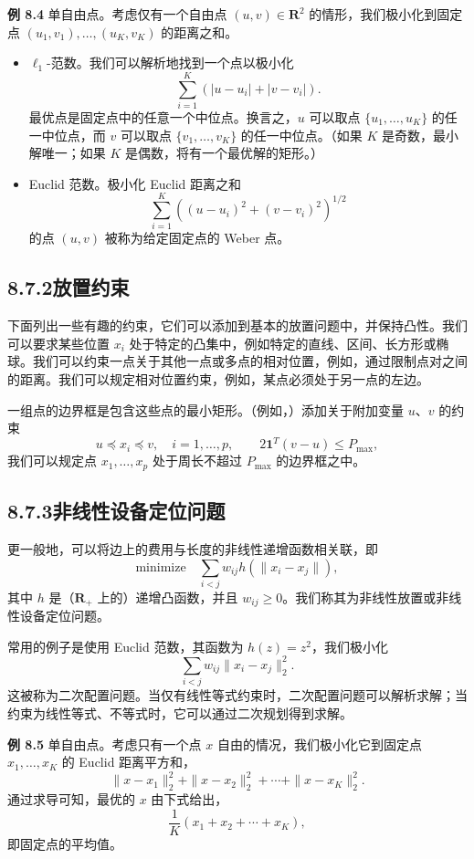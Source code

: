 \documentclass[UTF8, 12pt, fontset=fandol, oneside]{ctexart}
\begin{document}
\noindent\textbf{例 8.4}\quad
单自由点。考虑仅有一个自由点 $(u,v)\in\mathbf{R}^2$ 的情形，我们极小化到固定点 $(u_1,v_1),\ldots,(u_K,v_K)$ 的距离之和。

\begin{itemize}
\item $\ell_1$-范数。我们可以解析地找到一个点以极小化
\[
\sum_{i=1}^K(|u-u_i|+|v-v_i|).
\]
最优点是固定点中的任意一个中位点。换言之，$u$ 可以取点 $\{u_1,\ldots,u_K\}$ 的任一中位点，而 $v$ 可以取点 $\{v_1,\ldots,v_K\}$ 的任一中位点。（如果 $K$ 是奇数，最小解唯一；如果 $K$ 是偶数，将有一个最优解的矩形。）

\item Euclid 范数。极小化 Euclid 距离之和
\[
\sum_{i=1}^K\left((u-u_i)^2+(v-v_i)^2\right)^{1/2}
\]
的点 $(u,v)$ 被称为给定固定点的 Weber 点。
\end{itemize}

\subsection*{8.7.2\quad 放置约束}

下面列出一些有趣的约束，它们可以添加到基本的放置问题中，并保持凸性。我们可以要求某些位置 $x_i$ 处于特定的凸集中，例如特定的直线、区间、长方形或椭球。我们可以约束一点关于其他一点或多点的相对位置，例如，通过限制点对之间的距离。我们可以规定相对位置约束，例如，某点必须处于另一点的左边。

一组点的边界框是包含这些点的最小矩形。（例如，）添加关于附加变量 $u$、$v$ 的约束
\[
u\preceq x_i\preceq v,\quad i=1,\ldots,p,\qquad
2\mathbf{1}^T(v-u)\leq P_{\max},
\]
我们可以规定点 $x_1,\ldots,x_p$ 处于周长不超过 $P_{\max}$ 的边界框之中。

\subsection*{8.7.3\quad 非线性设备定位问题}

更一般地，可以将边上的费用与长度的非线性递增函数相关联，即
\[
\mbox{minimize}\quad \sum_{i<j} w_{ij}h(\|x_i-x_j\|),
\]
其中 $h$ 是（$\mathbf{R}_+$ 上的）递增凸函数，并且 $w_{ij}\geq 0$。我们称其为非线性放置或非线性设备定位问题。

常用的例子是使用 Euclid 范数，其函数为 $h(z)=z^2$，我们极小化
\[
\sum_{i<j}w_{ij}\|x_i-x_j\|_2^2.
\]
这被称为二次配置问题。当仅有线性等式约束时，二次配置问题可以解析求解；当约束为线性等式、不等式时，它可以通过二次规划得到求解。

\noindent\textbf{例 8.5}\quad
单自由点。考虑只有一个点 $x$ 自由的情况，我们极小化它到固定点 $x_1,\ldots,x_K$ 的 Euclid 距离平方和，
\[
\|x-x_1\|_2^2+\|x-x_2\|_2^2+\cdots+\|x-x_K\|_2^2.
\]
通过求导可知，最优的 $x$ 由下式给出，
\[
\frac{1}{K}(x_1+x_2+\cdots+x_K),
\]
即固定点的平均值。
\end{document}
